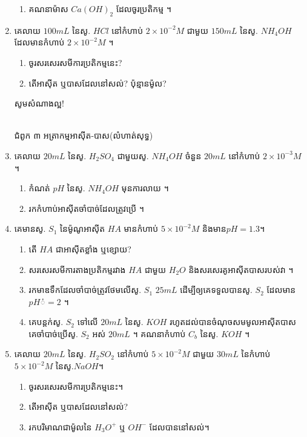 \documentclass[12pt, a5paper]{article}
\begin{document}
\begin{enumerate}[m]
\begin{enumerate}[k]
		\item គណនាម៉ាស $Ca(OH)_2$ ដែលចូរប្រតិកម្ម ។
	\end{enumerate}
	\item គេលាយ $100mL$ នៃសូ. $HCl$ នៅកំហាប់ $2\times 10^{-2}M$ ជាមួយ $150mL$ នៃសូ. $NH_4OH$ ដែលមានកំហាប់ $2\times10^{-2}M$ ។
	\begin{enumerate}[k]
		\item ចូរសរសេរសមីការប្រតិកម្មនេះ?
		\item តើអាស៊ីត ឬបាសដែលនៅសល់? ប៉ុន្មានម៉ូល?
	\end{enumerate}
	\begin{center}
	\sffamily\color{black}
	សូមសំណាងល្អ!
	\end{center}\newpage
	\begin{center}
		\sffamily\color{black}
		\\
		ជំពូក ៣ អត្រាកម្មអាស៊ីត-បាស(លំហាត់សុទ្ធ)
	\end{center}
	\item គេលាយ $20mL$ នៃសូ. $H_2SO_4$ ជាមួយសូ. $NH_4OH$ ចំនួន $20mL$ នៅកំហាប់ $2\times 10^{-3}M$ ។
	\begin{enumerate}[k]
		\item កំណត់ $pH$ នៃសូ. $NH_4OH$ មុនការលាយ ។
		\item រកកំហាប់អាស៊ីតចាំបាច់ដែលត្រូវប្រើ ។
	\end{enumerate}
	\item គេមានសូ. $S_1$ នៃម៉ូណូអាស៊ីត $HA$ មានកំហាប់ $5\times 10^{-2}M$ និងមាន$pH=1.3$។
	\begin{enumerate}[k]
		\item តើ $HA$ ជាអាស៊ីតខ្លាំង ឬខ្សោយ?
		\item សរសេរសមីការតាងប្រតិកម្មរវាង $HA$ ជាមួយ $H_2O$ និងសរសេរគូអាស៊ីតបាសរបស់វា ។
		\item រកមាឌទឹកដែលចាំបាច់ត្រូវថែមលើសូ. $S_1$ $25mL$ ដើម្បីឲ្យគេទទួលបានសូ. $S_2$ ដែលមាន $pH់=2$ ។
		\item គេបន្តក់សូ. $S_2$ ទៅលើ $20mL$ នៃសូ. $KOH$ រហូតដល់បានចំណុចសមមូលអាស៊ីតបាស គេចាំបាច់ប្រើសូ. $S_2$ អស់ $20mL$ ។ គណនាកំហាប់ $C_b$ នៃសូ. $KOH$ ។
	\end{enumerate}
	\item គេលាយ $20mL$ នៃសូ. $H_2SO_2$ នៅកំហាប់ $5\times 10^{-2}M$ ជាមួយ $30mL$ នៃកំហាប់ $5\times10^{-2}M$ នៃសូ.$NaOH$។
	\begin{enumerate}[k]
		\item ចូរសរសេរសមីការប្រតិកម្មនេះ។
		\item តើអាស៊ីត ឬបាសដែលនៅសល់?
		\item រកបរិមាណជាម៉ូលនៃ $H_3O^+$ ឬ $OH^-$ ដែលបាននៅសល់។

\end{enumerate}
\end{enumerate}
\end{document}
